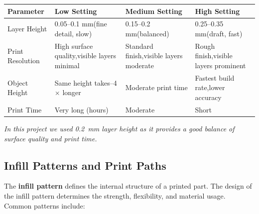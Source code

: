 \documentclass[12pt, a4paper]{article}
\renewcommand{\arraystretch}{1.3}
\begin{document}
\begin{center}
\renewcommand{\arraystretch}{1.4}
\begin{tabularx}{\textwidth}{|l|X|X|X|}
\hline
\textbf{Parameter} & \textbf{Low Setting} & \textbf{Medium Setting} & \textbf{High Setting} \\
\hline
Layer Height       & 0.05--0.1 mm\newline (fine detail, slow) &
                     0.15--0.2 mm\newline (balanced) &
                     0.25--0.35 mm\newline (draft, fast) \\
\hline
Print Resolution   & High surface quality,\newline visible layers minimal &
                     Standard finish,\newline visible layers moderate &
                     Rough finish,\newline visible layers prominent \\
\hline
Object Height      & Same height takes\newline 3--4$\times$ longer &
                     Moderate print time &
                     Fastest build rate,\newline lower accuracy \\
\hline
Print Time         & Very long (hours) & Moderate & Short \\
\hline
\end{tabularx}
\end{center}

\textit{In this project we used 0.2~mm layer height as it provides a good
balance of surface quality and print time.}

\subsection{Infill Patterns and Print Paths}

The \textbf{infill pattern} defines the internal structure of a printed part.
The design of the infill pattern determines the strength, flexibility, and
material usage. Common patterns include:
\end{document}

